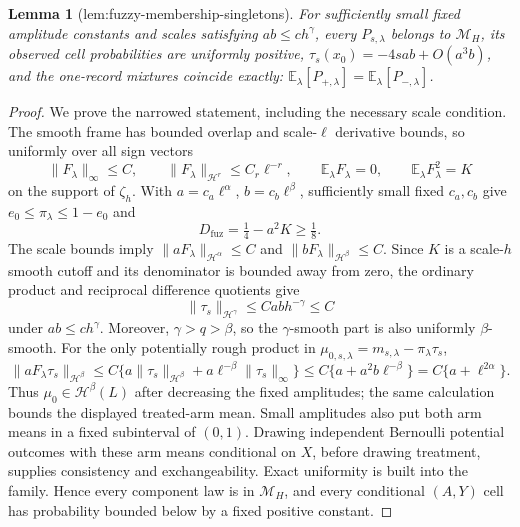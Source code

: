 \documentclass{article}
\newtheorem{lemma}{Lemma}
\begin{document}
\begin{lemma}[lem:fuzzy-membership-singletons]\label{lem:fuzzy-membership-singletons}
For sufficiently small fixed amplitude constants and scales satisfying \(ab\le c h^\gamma\), every \(P_{s,\lambda}\) belongs to \(\mathcal M_H\), its observed cell probabilities are uniformly positive, \(\tau_s(x_0)=-4sab+O(a^3b)\), and the one-record mixtures coincide exactly: \(\mathbb E_\lambda[P_{+,\lambda}]=\mathbb E_\lambda[P_{-,\lambda}]\).
\end{lemma}
\begin{proof}
We prove the narrowed statement, including the necessary scale condition.  The smooth frame has bounded overlap and scale-\(\ell\) derivative bounds, so uniformly over all sign vectors
\[
 \|F_\lambda\|_\infty\le C,
 \qquad \|F_\lambda\|_{\mathcal H^r}\le C_r\ell^{-r},
 \qquad \mathbb E_\lambda F_\lambda=0,
 \qquad \mathbb E_\lambda F_\lambda^2=K
\]
on the support of \(\zeta_h\).  With \(a=c_a\ell^\alpha\), \(b=c_b\ell^\beta\), sufficiently small fixed \(c_a,c_b\) give \(e_0\le\pi_\lambda\le1-e_0\) and
\[
 D_{\mathrm{fuz}}=\tfrac14-a^2K\ge\tfrac18.
\]
The scale bounds imply \(\|aF_\lambda\|_{\mathcal H^\alpha}\le C\) and \(\|bF_\lambda\|_{\mathcal H^\beta}\le C\).  Since \(K\) is a scale-\(h\) smooth cutoff and its denominator is bounded away from zero, the ordinary product and reciprocal difference quotients give
\[
 \|\tau_s\|_{\mathcal H^\gamma}\le Cabh^{-\gamma}\le C
\]
under \(ab\le c h^\gamma\).  Moreover, \(\gamma>q>\beta\), so the \(\gamma\)-smooth part is also uniformly \(\beta\)-smooth.  For the only potentially rough product in \(\mu_{0,s,\lambda}=m_{s,\lambda}-\pi_\lambda\tau_s\),
\[
 \|aF_\lambda\tau_s\|_{\mathcal H^\beta}
 \le C\{a\|\tau_s\|_{\mathcal H^\beta}
          +a\ell^{-\beta}\|\tau_s\|_\infty\}
 \le C\{a+a^2b\ell^{-\beta}\}
 =C\{a+\ell^{2\alpha}\}.
\]
Thus \(\mu_0\in\mathcal H^\beta(L)\) after decreasing the fixed amplitudes; the same calculation bounds the displayed treated-arm mean.  Small amplitudes also put both arm means in a fixed subinterval of \((0,1)\).  Drawing independent Bernoulli potential outcomes with these arm means conditional on \(X\), before drawing treatment, supplies consistency and exchangeability.  Exact uniformity is built into the family.  Hence every component law is in \(\mathcal M_H\), and every conditional \((A,Y)\) cell has probability bounded below by a fixed positive constant.


\end{proof}
\end{document}
